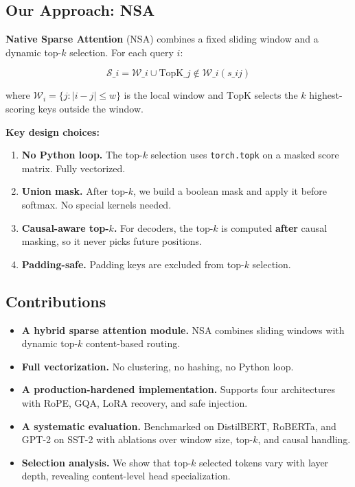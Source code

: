 \subsection{Our Approach: NSA}

\textbf{Native Sparse Attention} (NSA) combines a fixed sliding window and a 
dynamic top-$k$ selection. For each query $i$:

\[
\mathcal{S}\_i = \mathcal{W}\_i \cup \text{TopK}\_{j \notin \mathcal{W}\_i}(s\_{ij})
\tag{1.1}
\]

where $\mathcal{W}_i = \{j : |i - j| \leq w\}$ is the local window and 
$\text{TopK}$ selects the $k$ highest-scoring keys outside the window.

\textbf{Key design choices:}

\begin{enumerate}
\item \textbf{No Python loop.} The top-$k$ selection uses \texttt{torch.topk} on a
  masked score matrix. Fully vectorized.
\item \textbf{Union mask.} After top-$k$, we build a boolean mask and apply it
  before softmax. No special kernels needed.
\item \textbf{Causal-aware top-$k$.} For decoders, the top-$k$ is computed
  \textbf{after} causal masking, so it never picks future positions.
\item \textbf{Padding-safe.} Padding keys are excluded from top-$k$ selection.

\end{enumerate}
\subsection{Contributions}

\begin{itemize}
\item \textbf{A hybrid sparse attention module.} NSA combines sliding windows with
  dynamic top-$k$ content-based routing.
\item \textbf{Full vectorization.} No clustering, no hashing, no Python loop.
\item \textbf{A production-hardened implementation.} Supports four architectures
  with RoPE, GQA, LoRA recovery, and safe injection.
\item \textbf{A systematic evaluation.} Benchmarked on DistilBERT, RoBERTa, and GPT-2
  on SST-2 with ablations over window size, top-$k$, and causal handling.
\item \textbf{Selection analysis.} We show that top-$k$ selected tokens vary with
  layer depth, revealing content-level head specialization.

\end{itemize}
